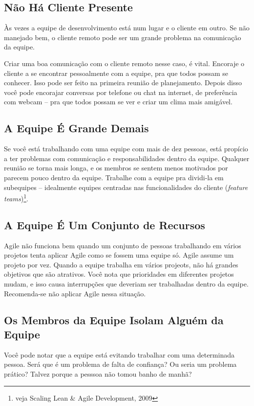 \documentclass[a4paper, 10pt, font=plain]{abnt}
\begin{document}
\subsection{Não Há Cliente Presente}
Às vezes a equipe de desenvolvimento está num lugar e o cliente em outro. Se não manejado bem, o cliente remoto pode ser um grande problema na comunicação da equipe.

Criar uma boa comunicação com o cliente remoto nesse caso, é vital. Encoraje o cliente a se encontrar pessoalmente com a equipe, pra que todos possam se conhecer. Isso pode ser feito na primeira reunião de planejamento. Depois disso você pode encorajar conversas por telefone ou chat na internet, de preferência com webcam -- pra que todos possam se ver e criar um clima mais amigável.


\subsection{A Equipe É Grande Demais}
Se você está trabalhando com uma equipe com mais de dez pessoas, está propício a ter problemas com comunicação e responsabilidades dentro da equipe. Qualquer reunião se torna mais longa, e os membros se sentem menos motivados por parecem pouco dentro da equipe. Trabalhe com a equipe pra dividi-la em subequipes -- idealmente equipes centradas nas funcionalidades do cliente (\textit{feature teams})\footnote{veja Scaling Lean \& Agile Development, 2009}.


\subsection{A Equipe É Um Conjunto de Recursos}
Agile não funciona bem quando um conjunto de pessoas trabalhando em vários projetos tenta aplicar Agile como se fossem uma equipe só. Agile assume um projeto por vez. Quando a equipe trabalha em vários projeots, não há grandes objetivos que são atrativos. Você nota que prioridades em diferentes projetos mudam, e isso causa interrupções que deveriam ser trabalhadas dentro da equipe. Recomenda-se não aplicar Agile nessa situação.



\subsection{Os Membros da Equipe Isolam Alguém da Equipe}
Você pode notar que a equipe está evitando trabalhar com uma determinada pessoa. Será que é um problema de falta de confiança? Ou seria um problema prático? Talvez porque a pesssoa não tomou banho de manhã?
\end{document}
